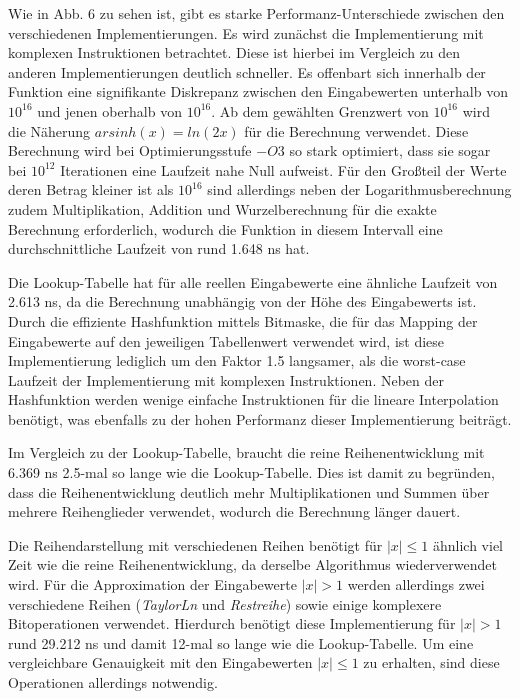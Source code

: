 \documentclass[course=erap] {aspdoc}
\begin{document}
    Wie in Abb. 6 zu sehen ist, gibt es starke Performanz-Unterschiede zwischen den verschiedenen Implementierungen.
    Es wird zunächst die Implementierung mit komplexen Instruktionen betrachtet.
    Diese ist hierbei im Vergleich zu den anderen Implementierungen deutlich schneller.
    Es offenbart sich innerhalb der Funktion eine signifikante Diskrepanz zwischen den Eingabewerten unterhalb von $10^{16}$ und jenen oberhalb von $10^{16}$.
    Ab dem gewählten Grenzwert von $10^{16}$ wird die Näherung $arsinh(x) = ln(2x)$ für die Berechnung verwendet.
    Diese Berechnung wird bei Optimierungsstufe $-O3$ so stark optimiert, dass sie sogar bei $10^{12}$ Iterationen eine Laufzeit nahe Null aufweist.
    Für den Großteil der Werte deren Betrag kleiner ist als $10^{16}$ sind allerdings neben der Logarithmusberechnung zudem Multiplikation, Addition und Wurzelberechnung für die exakte Berechnung erforderlich, wodurch die Funktion in diesem Intervall eine durchschnittliche Laufzeit von rund 1.648 ns hat.

    Die Lookup-Tabelle hat für alle reellen Eingabewerte eine ähnliche Laufzeit von 2.613 ns, da die Berechnung unabhängig von der Höhe des Eingabewerts ist.
    Durch die effiziente Hashfunktion mittels Bitmaske, die für das Mapping der Eingabewerte auf den jeweiligen Tabellenwert verwendet wird, ist diese Implementierung lediglich um den Faktor 1.5 langsamer, als die worst-case Laufzeit der Implementierung mit komplexen Instruktionen.
    Neben der Hashfunktion werden wenige einfache Instruktionen für die lineare Interpolation benötigt, was ebenfalls zu der hohen Performanz dieser Implementierung beiträgt.

    Im Vergleich zu der Lookup-Tabelle, braucht die reine Reihenentwicklung mit 6.369 ns 2.5-mal so lange wie die Lookup-Tabelle.
    Dies ist damit zu begründen, dass die Reihenentwicklung deutlich mehr Multiplikationen und Summen über mehrere Reihenglieder verwendet, wodurch die Berechnung länger dauert.

    Die Reihendarstellung mit verschiedenen Reihen benötigt für $|x|\leq1$ ähnlich viel Zeit wie die reine Reihenentwicklung, da derselbe Algorithmus wiederverwendet wird.
    Für die Approximation der Eingabewerte $|x|>1$ werden allerdings zwei verschiedene Reihen (\textit{TaylorLn} und \textit{Restreihe}) sowie einige komplexere Bitoperationen verwendet.
    Hierdurch benötigt diese Implementierung für $|x|>1$ rund 29.212 ns und damit 12-mal so lange wie die Lookup-Tabelle.
    Um eine vergleichbare Genauigkeit mit den Eingabewerten $|x|\leq1$ zu erhalten, sind diese Operationen allerdings notwendig.
\end{document}
